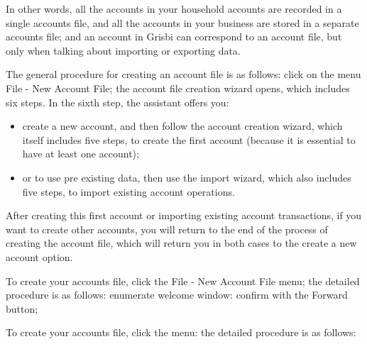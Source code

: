 In other words, all the accounts in your household accounts are recorded in a single accounts file, and all the accounts in your business are stored in a separate accounts file; and an account in Grisbi can correspond to an account file, but only when talking about importing or exporting data.


The general procedure for creating an account file is as follows: click on the menu File - New Account File; the account file creation wizard opens, which includes six steps. In the sixth step, the assistant offers you:

\begin{itemize}
\item  create a new account, and then follow the account creation wizard, which itself includes five steps, to create the first account (because it is essential to have at least one account);
\item or to use pre existing data, then use the import wizard, which also includes five steps, to import existing account operations.
\end{itemize}

After creating this first account or importing existing account transactions, if you want to create other accounts, you will return to the end of the process of creating the account file, which will return you in both cases to the create a new account option.


To create your accounts file, click the File - New Account File menu; the detailed procedure is as follows:
enumerate
welcome window: confirm with the Forward button;

To create your accounts file, click the  menu: the detailed procedure is as follows:

